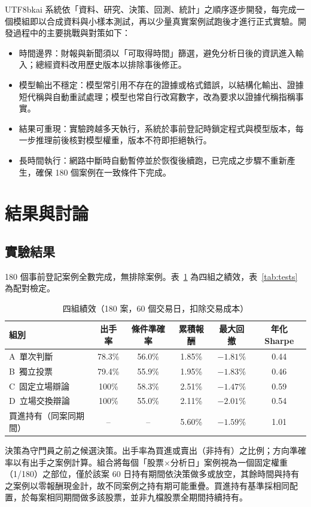 \documentclass[12pt,a4paper]{article}
\newcommand{\grp}[1]{\textsf{#1}}
\begin{document}
\begin{CJK}{UTF8}{bkai}
系統依「資料、研究、決策、回測、統計」之順序逐步開發，每完成一個模組即以合成資料與小樣本測試，再以少量真實案例試跑後才進行正式實驗。開發過程中的主要挑戰與對策如下：

\begin{itemize}
  \item 時間邊界：財報與新聞須以「可取得時間」篩選，避免分析日後的資訊進入輸入；總經資料改用歷史版本以排除事後修正。
  \item 模型輸出不穩定：模型常引用不存在的證據或格式錯誤，以結構化輸出、證據短代稱與自動重試處理；模型也常自行改寫數字，改為要求以證據代稱指稱事實。
  \item 結果可重現：實驗跨越多天執行，系統於事前登記時鎖定程式與模型版本，每一步推理前後核對模型權重，版本不符即拒絕執行。
  \item 長時間執行：網路中斷時自動暫停並於恢復後續跑，已完成之步驟不重新產生，確保 180 個案例在一致條件下完成。
\end{itemize}

\section{結果與討論}

\subsection{實驗結果}

180 個事前登記案例全數完成，無排除案例。表~\ref{tab:main} 為四組之績效，表~\ref{tab:tests} 為配對檢定。

\begin{table}[H]
\centering\small
\caption{四組績效（180 案，60 個交易日，扣除交易成本）}
\label{tab:main}
\begin{tabular}{@{}lccccc@{}}
\toprule
組別 & 出手率 & 條件準確率 & 累積報酬 & 最大回撤 & 年化 Sharpe \\
\midrule
\grp{A}\ 單次判斷 & 78.3\% & 56.0\% & 1.85\% & $-1.81\%$ & 0.44 \\
\grp{B}\ 獨立投票 & 79.4\% & 55.9\% & 1.95\% & $-1.83\%$ & 0.46 \\
\grp{C}\ 固定立場辯論 & 100\% & 58.3\% & 2.51\% & $-1.47\%$ & 0.59 \\
\grp{D}\ 立場交換辯論 & 100\% & 55.0\% & 2.11\% & $-2.01\%$ & 0.54 \\
\midrule
買進持有（同案同期間） & -- & -- & 5.60\% & $-1.59\%$ & 1.01 \\
\bottomrule
\end{tabular}
\par\smallskip
\raggedright\footnotesize 決策為守門員之前之候選決策。出手率為買進或賣出（非持有）之比例；方向準確率以有出手之案例計算。組合將每個「股票×分析日」案例視為一個固定權重（1/180）之部位，僅於該案 60 日持有期間依決策做多或放空，其餘時間與持有之案例以零報酬現金計，故不同案例之持有期可能重疊。買進持有基準採相同配置，於每案相同期間做多該股票，並非九檔股票全期間持續持有。
\end{table}


\end{CJK}
\end{document}
